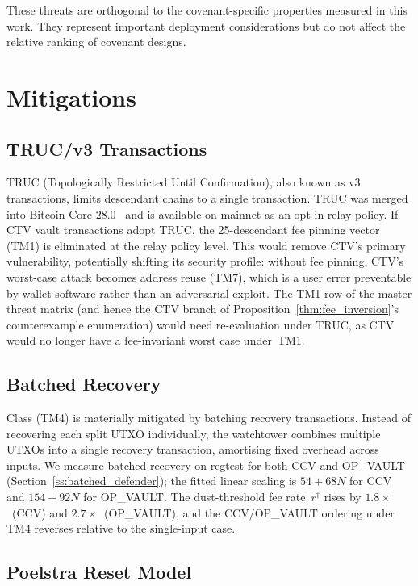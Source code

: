 These threats are orthogonal to the covenant-specific properties measured in this
work. They represent important deployment considerations but do not affect the
relative ranking of covenant designs.

\section{Mitigations} \label{se:mitigations}

\subsection{TRUC/v3 Transactions}

TRUC (Topologically Restricted Until Confirmation), also known as v3 transactions,
limits descendant chains to a single transaction. TRUC was merged into Bitcoin Core
28.0~\cite{CoreRelay} and is available on mainnet as an opt-in relay policy.
If CTV vault transactions adopt TRUC, the 25-descendant fee pinning vector (TM1)
is eliminated at the relay policy level. This would remove CTV's primary
vulnerability, potentially shifting its
security profile: without fee pinning, CTV's worst-case attack becomes address reuse
(TM7), which is a user error preventable by wallet software rather than an adversarial
exploit. The TM1 row of the master threat matrix (and hence the CTV
branch of Proposition~\ref{thm:fee_inversion}'s counterexample
enumeration) would need re-evaluation under TRUC, as CTV would no
longer have a fee-invariant worst case under~TM1.

\subsection{Batched Recovery}

Class \classscale{} (TM4) is materially mitigated by batching
recovery transactions. Instead of recovering each split UTXO
individually, the watchtower combines multiple UTXOs into a single
recovery transaction, amortising fixed overhead across inputs. We
measure batched recovery on regtest for both CCV and OP\_VAULT
(Section~\ref{ss:batched_defender}); the fitted linear scaling is
$54 + 68 N$\vB{} for CCV and $154 + 92 N$\vB{} for OP\_VAULT. The
dust-threshold fee rate~$r^\dagger$ rises by $1.8\times$~(CCV) and
$2.7\times$~(OP\_VAULT), and the CCV/OP\_VAULT ordering under TM4
reverses relative to the single-input case.

\subsection{Poelstra Reset Model}

